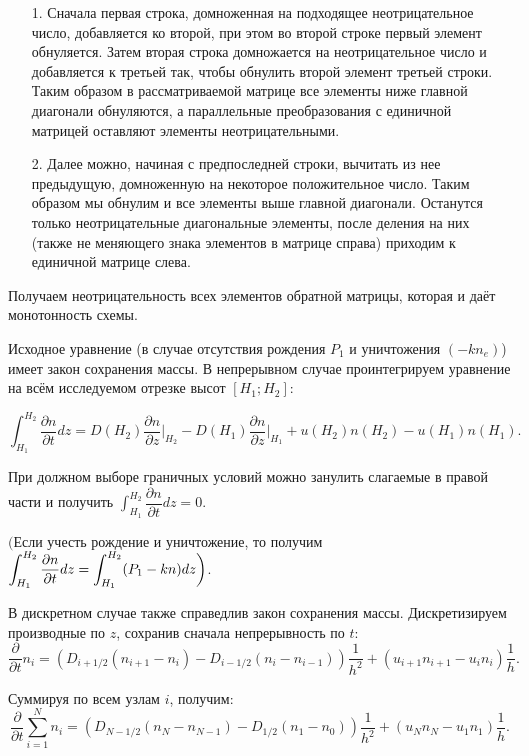 \documentclass[12pt, a5paper, fleqn, twoside]{article}
\newcommand*{\hm}[1]{#1\nobreak\discretionary{}%
{\hbox{$\mathsurround=0pt #1$}}{}}
\def\hm#1{#1\nobreak\discretionary{}{\hbox{$#1$}}{}}
\theoremstyle{definiton}
\theoremstyle{definition}
\begin{document}
\begin{itemize}
\item[1.] Сначала первая строка, домноженная на подходящее неотрицательное число, добавляется ко второй, при этом во второй строке первый элемент обнуляется. Затем вторая строка домножается на неотрицательное число и добавляется к третьей так, чтобы обнулить второй элемент третьей строки. Таким образом в рассматриваемой матрице все элементы ниже главной диагонали обнуляются, а параллельные преобразования с единичной матрицей оставляют элементы неотрицательными.

\item[2.] Далее можно, начиная с предпоследней строки, вычитать из нее предыдущую, домноженную на некоторое положительное число. Таким образом мы обнулим и все элементы выше главной диагонали. Останутся только неотрицательные диагональные элементы, после деления на них (также не меняющего знака элементов в матрице справа) приходим к единичной матрице слева.
\end{itemize}

Получаем неотрицательность всех элементов обратной матрицы, которая и даёт монотонность схемы.
\bigskip

Исходное уравнение (в случае отсутствия рождения $P_1$ и уничтожения $(-kn_e)$) имеет закон сохранения массы. В непрерывном случае проинтегрируем уравнение на всём исследуемом отрезке высот $[H_1; H_2]$: 

$$\int_{H_1}^{H_2} \dfrac{\partial n}{\partial t} dz = D(H_2)\dfrac{\partial n}{\partial z}\bigg|_{H_2}-D(H_1)\dfrac{\partial n}{\partial z}\bigg|_{H_1}+u(H_2)n(H_2)-u(H_1)n(H_1).$$

При должном выборе граничных условий можно занулить слагаемые в правой части и получить $\displaystyle\int_{H_1}^{H_2}\dfrac{\partial n}{\partial t} dz = 0$.

$\bigg($Если учесть рождение и уничтожение, то получим $\displaystyle\int_{H_1}^{H_2}\dfrac{\partial n}{\partial t} dz \hm= \displaystyle\int_{H_1}^{H_2} (P_1-kn)dz\bigg)$.

\bigskip

В дискретном случае также справедлив закон сохранения массы. Дискретизируем производные по $z$, сохранив сначала непрерывность по $t$: $$\dfrac{\partial}{\partial t} n_i = (D_{i+1/2}(n_{i+1}-n_i)-D_{i-1/2}(n_i-n_{i-1}))\dfrac{1}{h^2}+(u_{i+1}n_{i+1}-u_i n_i)\dfrac{1}{h}.$$

Суммируя по всем узлам $i$, получим: $$\dfrac{\partial}{\partial t} \displaystyle\sum_{i=1}^{N} n_i = (D_{N-1/2}(n_{N}-n_{N-1})-D_{1/2}(n_1-n_0))\dfrac{1}{h^2}+(u_{N}n_{N}-u_1 n_1)\dfrac{1}{h}.$$
\end{document}
